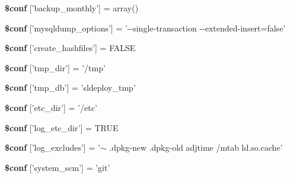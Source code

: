 \begin{DoxyCompactItemize}
\item 
\hypertarget{config__default_8inc_8php_a1ad175991ef984bed824749c6accb5ed}{
{\bfseries \$conf} \mbox{[}'backup\_\-monthly'\mbox{]} = array()}
\label{config__default_8inc_8php_a1ad175991ef984bed824749c6accb5ed}

\item 
\hypertarget{config__default_8inc_8php_aaabc610ec41782e3feb73906588ece85}{
{\bfseries \$conf} \mbox{[}'mysqldump\_\-options'\mbox{]} = '-\/-\/single-\/transaction -\/-\/extended-\/insert=false'}
\label{config__default_8inc_8php_aaabc610ec41782e3feb73906588ece85}

\item 
\hypertarget{config__default_8inc_8php_a3b50628c86dddb8f7837efa7ecb01f52}{
{\bfseries \$conf} \mbox{[}'create\_\-hashfiles'\mbox{]} = FALSE}
\label{config__default_8inc_8php_a3b50628c86dddb8f7837efa7ecb01f52}

\item 
\hypertarget{config__default_8inc_8php_a8e02fb9ec0b880abf1e06f84ad66ced0}{
{\bfseries \$conf} \mbox{[}'tmp\_\-dir'\mbox{]} = '/tmp'}
\label{config__default_8inc_8php_a8e02fb9ec0b880abf1e06f84ad66ced0}

\item 
\hypertarget{config__default_8inc_8php_a20ade2c1e9a5aef5c29458f31d5913cd}{
{\bfseries \$conf} \mbox{[}'tmp\_\-db'\mbox{]} = 'sldeploy\_\-tmp'}
\label{config__default_8inc_8php_a20ade2c1e9a5aef5c29458f31d5913cd}

\item 
\hypertarget{config__default_8inc_8php_a4d470d39812a4ba6a83eca38c085759d}{
{\bfseries \$conf} \mbox{[}'etc\_\-dir'\mbox{]} = '/etc'}
\label{config__default_8inc_8php_a4d470d39812a4ba6a83eca38c085759d}

\item 
\hypertarget{config__default_8inc_8php_a256141b84c9259704057b33993045715}{
{\bfseries \$conf} \mbox{[}'log\_\-etc\_\-dir'\mbox{]} = TRUE}
\label{config__default_8inc_8php_a256141b84c9259704057b33993045715}

\item 
\hypertarget{config__default_8inc_8php_a5cfffe36ebd46e7b47bcca02bdca66a0}{
{\bfseries \$conf} \mbox{[}'log\_\-excludes'\mbox{]} = '$\sim$ .dpkg-\/new .dpkg-\/old adjtime /mtab ld.so.cache'}
\label{config__default_8inc_8php_a5cfffe36ebd46e7b47bcca02bdca66a0}

\item 
\hypertarget{config__default_8inc_8php_a4fe4a102bdcf4beda8ed0860595092b9}{
{\bfseries \$conf} \mbox{[}'system\_\-scm'\mbox{]} = 'git'}
\label{config__default_8inc_8php_a4fe4a102bdcf4beda8ed0860595092b9}


\end{DoxyCompactItemize}
